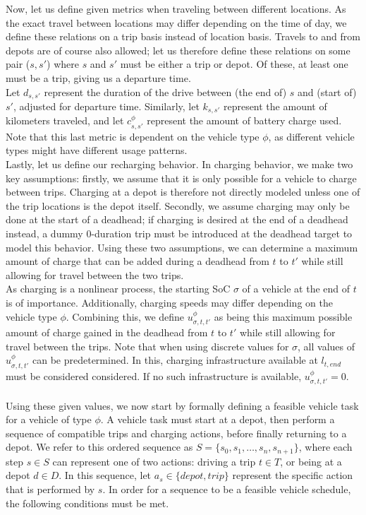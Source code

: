 \documentclass[]{article}
\begin{document}
Now, let us define given metrics when traveling between different locations. As the exact travel between locations may differ depending on the time of day, we define these relations on a trip basis instead of location basis. Travels to and from depots are of course also allowed; let us therefore define these relations on some pair ($s,s'$) where $s$ and $s'$ must be either a trip or depot. Of these, at least one must be a trip, giving us a departure time. \\
Let $d_{s,s'}$ represent the duration of the drive between (the end of) $s$ and (start of) $s'$, adjusted for departure time. Similarly, let $k_{s, s'}$ represent the amount of kilometers traveled, and let $c^\phi_{s, s'}$ represent the amount of battery charge used. Note that this last metric is dependent on the vehicle type $\phi$, as different vehicle types might have different usage patterns. \\
Lastly, let us define our recharging behavior. In charging behavior, we make two key assumptions: firstly, we assume that it is only possible for a vehicle to charge between trips. Charging at a depot is therefore not directly modeled unless one of the trip locations is the depot itself. Secondly, we assume charging may only be done at the start of a deadhead; if charging is desired at the end of a deadhead instead, a dummy 0-duration trip must be introduced at the deadhead target to model this behavior. Using these two assumptions, we can determine a maximum amount of charge that can be added during a deadhead from $t$ to $t'$ while still allowing for travel between the two trips. \\
As charging is a nonlinear process, the starting SoC $\sigma$ of a vehicle at the end of $t$ is of importance. Additionally, charging speeds may differ depending on the vehicle type $\phi$. Combining this, we define $u^\phi_{\sigma,t,t'}$ as being this maximum possible amount of charge gained in the deadhead from $t$ to $t'$ while still allowing for travel between the trips. Note that when using discrete values for $\sigma$, all values of $u^\phi_{\sigma,t, t'}$ can be predetermined. In this, charging infrastructure available at $l_{t,end}$ must be considered considered. If no such infrastructure is available, $u^\phi_{\sigma,t, t'} = 0$. \\\\
Using these given values, we now start by formally defining a feasible vehicle task for a vehicle of type $\phi$. A vehicle task must start at a depot, then perform a sequence of compatible trips and charging actions, before finally returning to a depot. We refer to this ordered sequence as $S = \{ s_0, s_1, \dots, s_n, s_{n+1} \}$, where each step $s \in S$ can represent one of two actions: driving a trip $t \in T$, or being at a depot $d \in D$. In this sequence, let $a_s \in \{ depot, trip \}$ represent the specific action that is performed by $s$. In order for a sequence to be a feasible vehicle schedule, the following conditions must be met. \\
\end{document}
